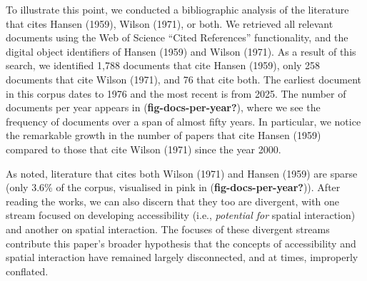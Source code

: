 \documentclass[
11pt, %
oneside, %
english, %
singlespacing, %
]{macthesis} %
\begin{document}
To illustrate this point, we conducted a bibliographic analysis of the literature that cites Hansen (1959), Wilson (1971), or both. We retrieved all relevant documents using the Web of Science ``Cited References'' functionality, and the digital object identifiers of Hansen (1959) and Wilson (1971). As a result of this search, we identified 1,788 documents that cite Hansen (1959), only 258 documents that cite Wilson (1971), and 76 that cite both. The earliest document in this corpus dates to 1976 and the most recent is from 2025. The number of documents per year appears in (\textbf{fig-docs-per-year?}), where we see the frequency of documents over a span of almost fifty years. In particular, we notice the remarkable growth in the number of papers that cite Hansen (1959) compared to those that cite Wilson (1971) since the year 2000.

As noted, literature that cites both Wilson (1971) and Hansen (1959) are sparse (only 3.6\% of the corpus, visualised in pink in (\textbf{fig-docs-per-year?})). After reading the works, we can also discern that they too are divergent, with one stream focused on developing accessibility (i.e., \emph{potential for} spatial interaction) and another on spatial interaction. The focuses of these divergent streams contribute this paper's broader hypothesis that the concepts of accessibility and spatial interaction have remained largely disconnected, and at times, improperly conflated.
\end{document}
